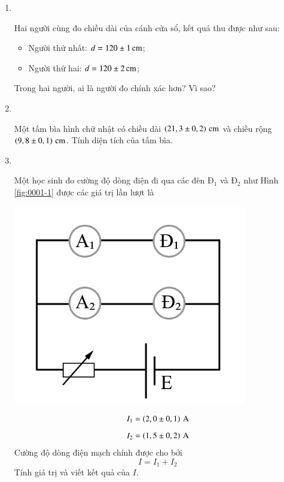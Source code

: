\begin{enumerate}[label=\bfseries Bài \arabic*:,leftmargin=1.5cm]
	\item {}\\
	{Hai người cùng đo chiều dài của cánh cửa sổ, kết quả thu được như sau:
		\begin{itemize}
			\item Người thứ nhất: $d=\xsi{120\pm1}{\centi\meter}$;
			\item Người thứ hai: $d=\xsi{120\pm 2}{\centi\meter}$;
		\end{itemize}
	Trong hai người, ai là người đo chính xác hơn? Vì sao?
}
	
	\item {}\\
	{Một tấm bìa hình chữ nhật có chiều dài $\xsi{\left(21,3\pm0,2\right)}{\centi\meter}$ và chiều rộng $\xsi{\left(9,8\pm0,1\right)}{\centi\meter}$. Tính diện tích của tấm bìa.
	
}

\item {}\\
{Một học sinh đo cường độ dòng điện đi qua các đèn $\text{Đ}_1$ và $\text{Đ}_2$ như Hình \ref{fig:0001-1} được các giá trị lần lượt là 
	\begin{center}
		\includegraphics[width=0.3\linewidth]{../figs/VN10-2023-PH-TP0001-1}
		\label{fig:0001-1}
	\end{center}
	$$I_1=\xsi{\left(2,0\pm0,1\right)}{\ampere}$$
	$$I_2=\xsi{\left(1,5\pm0,2\right)}{\ampere}$$
	Cường độ dòng điện mạch chính được cho bởi
	$$I=I_1+I_2$$
	Tính giá trị và viết kết quả của $I$.


}
\end{enumerate}
